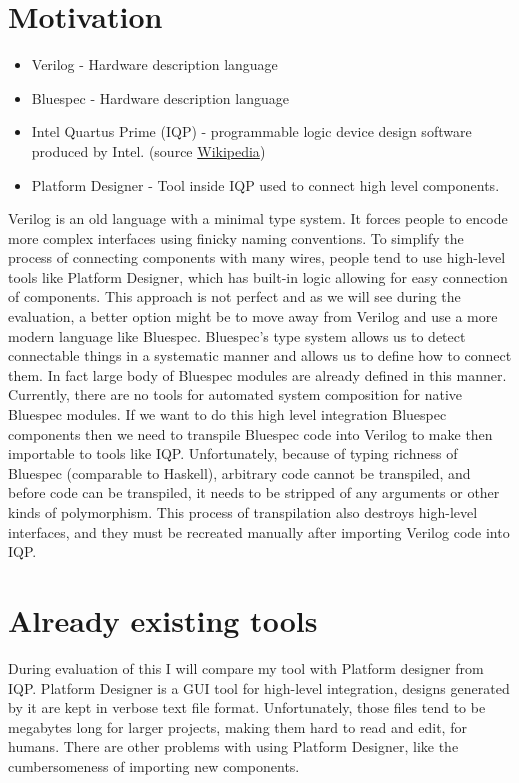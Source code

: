 \documentclass[12pt]{report}
\begin{document}
\section{Motivation}
\begin{tcolorbox}[title=Vocabulary]
    \begin{itemize}
        \item Verilog - Hardware description language
        \item Bluespec - Hardware description language
        \item Intel Quartus Prime (IQP) - programmable logic device design software produced by Intel. (source \href{https://en.wikipedia.org/wiki/Intel_Quartus_Prime}{Wikipedia})
        \item Platform Designer - Tool inside IQP used to connect high level components.
    \end{itemize}
\end{tcolorbox}
Verilog is an old language with a minimal type system. It forces people to encode more complex interfaces using finicky naming conventions. To simplify the process of connecting components with many wires, people tend to use high-level tools like Platform Designer, which has built-in logic allowing for easy connection of components. This approach is not perfect and as we will see during the evaluation, a better option might be to move away from Verilog and use a more modern language like Bluespec. Bluespec's type system allows us to detect connectable things in a systematic manner and allows us to define how to connect them. In fact large body of Bluespec modules are already defined in this manner. Currently, there are no tools for automated system composition for native Bluespec modules. If we want to do this high level integration Bluespec components then we need to transpile Bluespec code into Verilog to make then importable to tools like IQP. Unfortunately, because of typing richness of Bluespec (comparable to Haskell), arbitrary code cannot be transpiled, and before code can be transpiled, it needs to be stripped of any arguments or other kinds of polymorphism. This process of transpilation also destroys high-level interfaces, and they must be recreated manually after importing Verilog code into IQP.

\section{Already existing tools}
During evaluation of this I will compare my tool with Platform designer from IQP. 
Platform Designer is a GUI tool for high-level integration, designs generated by it are kept in verbose text file format. Unfortunately, those files tend to be megabytes long for larger projects, making them hard to read and edit, for humans. 
There are other problems with using Platform Designer, like the cumbersomeness of importing new components.
\end{document}
